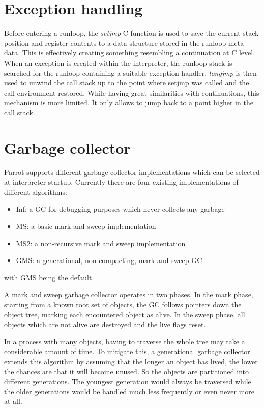 \documentclass[bachelor,english]{hgbthesis}
\begin{document}
\section{Exception handling}

Before entering a runloop, the \textit{setjmp} C function is used to save the current stack position and register contents to a data structure stored in the runloop meta data. This is effectively creating something resembling a continuation at C level. When an exception is created within the interpreter, the runloop stack is searched for the runloop containing a suitable exception handler. \textit{longjmp} is then used to unwind the call stack up to the point where setjmp was called and the call environment restored. While having great similarities with continuations, this mechanism is more limited. It only allows to jump back to a point higher in the call stack.

\section{Garbage collector}

Parrot supports different garbage collector implementations which can be selected at interpreter startup. Currently there are four existing implementations of different algorithms:
\begin{itemize}
\item Inf: a GC for debugging purposes which never collects any garbage
\item MS: a basic mark and sweep implementation
\item MS2: a non-recursive mark and sweep implementation
\item GMS: a generational, non-compacting, mark and sweep GC
\end{itemize}
with GMS being the default.

A mark and sweep garbage collector operates in two phases. In the mark phase, starting from a known root set of objects, the GC follows pointers down the object tree, marking each encountered object as alive. In the sweep phase, all objects which are not alive are destroyed and the live flags reset.

In a process with many objects, having to traverse the whole tree may take a considerable amount of time. To mitigate this, a generational garbage collector extends this algorithm by assuming that the longer an object has lived, the lower the chances are that it will become unused. So the objects are partitioned into different generations. The youngest generation would always be traversed while the older generations would be handled much less frequently or even never more at all.
\end{document}
